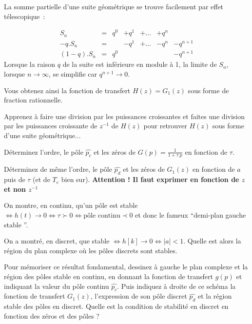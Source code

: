 \begin{remarque}
  La somme partielle d'une suite géométrique se trouve facilement par effet télescopique~:

\begin{equation*}
  \begin{array}{cccccccc}
    S_n       &=&   q^0     &+q^1   & +\dots &  + q^{n} &  \\
    -q.S_n     &=&         &-q^1 & +\dots & - q^{n} &- q^{n+1}  \\\hline
    (1-q).S_n &=&   q^0  &       &         &       & -q^{n+1}
  \end{array}
\end{equation*}
Lorsque la raison $q$ de la suite est inférieure en module à 1, la
limite de $S_n$, lorsque $n\to \infty$, se simplifie car $q^{n+1}\to 0$.
\end{remarque}


Vous obtenez ainsi la fonction de transfert $H(z)=G_1(z)$ sous forme de fraction rationnelle. 
\begin{remarque}
  Apprenez à faire une division par les puissances croissantes et
  faites une division par les puissances croissante de $z^{-1}$ de
  $H(z)$ pour retrouver $H(z)$ sous forme d'une suite géométrique...


\end{remarque}




Déterminez l'ordre, le pôle $\widehat{p_c}$ et les zéros de
$G(p)=\frac{1}{1+\tau.p}$ en fonction de $\tau$. 


Déterminez de même l'ordre, le pôle $\widehat{p_d}$ et les zéros de $G_1(z)$
en fonction de $a$ puis de $\tau$ (et de $T_e$ bien
sur). \textbf{Attention ! Il faut exprimer en fonction de $z$ et non
  $z^{-1}$}

On montre, en continu, qu'un pôle est stable $\iff h(t) \to 0 \iff \tau\succ 0 \iff \text{pôle continu} \prec 0$ et donc le fameux ``demi-plan gauche stable ''.

On a montré, en discret, que stable $\iff h[k] \to 0 \iff |a|<1$. Quelle est alors la région du plan complexe où les pôles discrets sont stables. 

Pour mémoriser ce résultat fondamental, dessinez à gauche le plan
complexe et la région des pôles stable en continu, en donnant la
fonction de transfert $g(p)$ et indiquant la valeur du pôle continu
$\widehat{p_c}$.  Puis indiquez à droite de ce schéma la fonction de transfert
$G_1(z)$, l'expression de son pôle discret $\widehat{p_d}$ et la région stable
des pôles en discret.  Quelle est la condition de stabilité en discret
en fonction des zéros et des pôles ?

